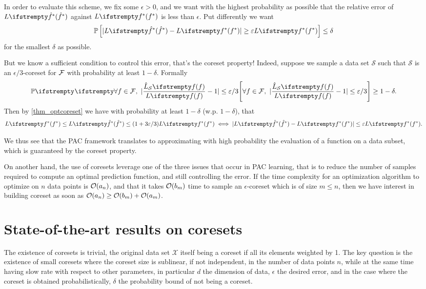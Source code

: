 In order to evaluate this scheme, we fix some $\epsilon>0$, and we want with the highest probability as possible that the relative error of $\loss{\hat\query^*}$ against $\loss{\query^*}$ is less than $\epsilon$. Put differently we want
\begin{equation*}
	\mathbb{P}\left[|\loss{\hat\query^*} - \loss{\query^*}| \ge \epsilon \loss{\query^*}\right] \leq \delta
\end{equation*}
for the smallest $\delta$ as possible.

But we know a sufficient condition to control this error, that's the coreset property! Indeed, suppose we sample a data set $\mathcal{S}$ such that $\mathcal{S}$ is an $\epsilon/3$-coreset for $\mathcal{F}$ with probability at least $1-\delta$. Formally
\begin{equation*}
    \PP{}{\forall f \in \qset,\ |\frac{\estloss{\mathcal{S}}{\query}}{\loss{\query}} - 1| \leq \epsilon/3} \geq 1- \delta.
\end{equation*}
Then by \cref{thm_optcoreset} we have with probability at least $1-\delta$ (w.p. $1-\delta$), that
\begin{equation*}
    \loss{\query^*} \leq \loss{\hat\query^*} \leq (1+ 3 \epsilon/3) \loss{\query^*} \iff
    |\loss{\hat\query^*} - \loss{\query^*}| \leq \epsilon \loss{\query^*}.
\end{equation*}

We thus see that the PAC framework translates to approximating with high probability the evaluation of a function on a data subset, which is guaranteed by the coreset property. 

On another hand, the use of coresets leverage one of the three issues that occur in PAC learning, that is to reduce the number of samples required to compute an optimal prediction function, and still controlling the error. If the time complexity for an optimization algorithm to optimize on $n$ data points is $\mathcal{O}(a_n)$, and that it takes $\mathcal{O}(b_m)$ time to sample an $\epsilon$-coreset which is of size $m \le n$, then we have interest in building coreset as soon as $\mathcal{O}(a_n) \geq \mathcal{O}(b_m) + \mathcal{O}(a_m)$.





    

\section{State-of-the-art results on coresets}
The existence of coresets is trivial, the original data set $\mathcal{X}$ itself  being a coreset if all its elements weighted by 1. The key question is the existence of small coresets where the coreset size is sublinear, if not independent, in the number of data points $n$, while at the same time having slow rate with respect to other parameters, in particular $d$ the dimension of data, $\epsilon$ the desired error, and in the case where the coreset is obtained probabilistically, $\delta$ the probability bound of not being a coreset.

